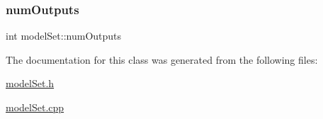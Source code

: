 \mbox{\label{classmodel_set_addc0df56b9f1970c9816050634933716}} 
\subsubsection{\texorpdfstring{num\+Outputs}{numOutputs}}
{\footnotesize\ttfamily int model\+Set\+::num\+Outputs\hspace{0.3cm}{\ttfamily [protected]}}



The documentation for this class was generated from the following files\+:\begin{DoxyCompactItemize}
\item 
\hyperlink{model_set_8h}{model\+Set.\+h}\item 
\hyperlink{model_set_8cpp}{model\+Set.\+cpp}\end{DoxyCompactItemize}
